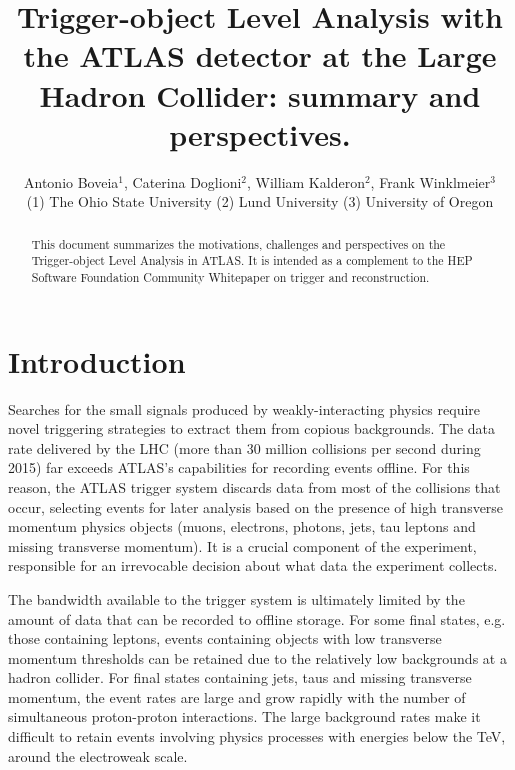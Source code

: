 \documentclass[a4paper,justified]{tufte-handout}
\title{Trigger-object Level Analysis with the ATLAS detector at the Large Hadron Collider: summary and perspectives.}
\author[Experiment]{Antonio Boveia$^1$, Caterina Doglioni$^2$, William Kalderon$^2$, Frank Winklmeier$^3$\\
(1) The Ohio State University (2) Lund University (3) University of Oregon}
\begin{document}

\maketitle%


\begin{fullwidth}
\vspace{-10px}

\begin{abstract}


\noindent This document summarizes the motivations, challenges and perspectives on the Trigger-object Level Analysis in ATLAS. It is intended as a complement to the HEP Software Foundation Community Whitepaper on trigger and reconstruction. 
\end{abstract}

\end{fullwidth}

\tableofcontents

\section{Introduction}\label{sec:introduction}

Searches for the small signals produced by weakly-interacting physics require novel triggering strategies to extract them from copious backgrounds. The data rate delivered by the LHC (more than 30 million collisions per second during 2015) far exceeds ATLAS's capabilities for recording events offline. For this reason, the ATLAS trigger system discards data from most of the collisions that occur, selecting events for later analysis based on the presence of high transverse momentum physics objects (muons, electrons, photons, jets, tau leptons and missing transverse momentum). It is a crucial component of the experiment, responsible for an irrevocable decision about what data the experiment collects. 

The bandwidth available to the trigger system is ultimately limited by the amount of data that can be recorded to offline storage. For some final states, e.g. those containing leptons, events containing objects with low transverse momentum thresholds can be retained due to the relatively low backgrounds at a hadron collider. For final states containing jets, taus and missing transverse momentum, the event rates are large and grow rapidly with the number of simultaneous proton-proton interactions. The large background rates make it difficult to retain events involving physics processes with energies below the TeV, around the electroweak scale. 
\end{document}
